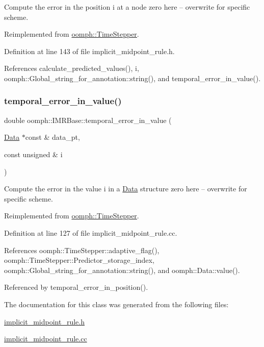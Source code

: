 Compute the error in the position i at a node zero here -- overwrite for specific scheme. 

Reimplemented from \hyperlink{classoomph_1_1TimeStepper_ac463807aff4bcbedd6e8a463c7390536}{oomph\+::\+Time\+Stepper}.



Definition at line 143 of file implicit\+\_\+midpoint\+\_\+rule.\+h.



References calculate\+\_\+predicted\+\_\+values(), i, oomph\+::\+Global\+\_\+string\+\_\+for\+\_\+annotation\+::string(), and temporal\+\_\+error\+\_\+in\+\_\+value().

\mbox{\label{classoomph_1_1IMRBase_aa51711d15be423119178f2b0c5ec8097}} 
\subsubsection{\texorpdfstring{temporal\+\_\+error\+\_\+in\+\_\+value()}{temporal\_error\_in\_value()}}
{\footnotesize\ttfamily double oomph\+::\+I\+M\+R\+Base\+::temporal\+\_\+error\+\_\+in\+\_\+value (\begin{DoxyParamCaption}\item[{\hyperlink{classoomph_1_1Data}{Data} $\ast$const \&}]{data\+\_\+pt,  }\item[{const unsigned \&}]{i }\end{DoxyParamCaption})\hspace{0.3cm}{\ttfamily [virtual]}}

Compute the error in the value i in a \hyperlink{classoomph_1_1Data}{Data} structure zero here -- overwrite for specific scheme. 

Reimplemented from \hyperlink{classoomph_1_1TimeStepper_a27f66759f6d9b2040d26918adb998c78}{oomph\+::\+Time\+Stepper}.



Definition at line 127 of file implicit\+\_\+midpoint\+\_\+rule.\+cc.



References oomph\+::\+Time\+Stepper\+::adaptive\+\_\+flag(), oomph\+::\+Time\+Stepper\+::\+Predictor\+\_\+storage\+\_\+index, oomph\+::\+Global\+\_\+string\+\_\+for\+\_\+annotation\+::string(), and oomph\+::\+Data\+::value().



Referenced by temporal\+\_\+error\+\_\+in\+\_\+position().



The documentation for this class was generated from the following files\+:\begin{DoxyCompactItemize}
\item 
\hyperlink{implicit__midpoint__rule_8h}{implicit\+\_\+midpoint\+\_\+rule.\+h}\item 
\hyperlink{implicit__midpoint__rule_8cc}{implicit\+\_\+midpoint\+\_\+rule.\+cc}\end{DoxyCompactItemize}
